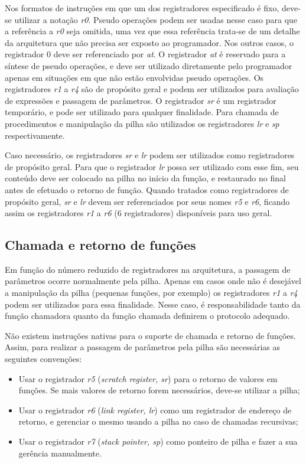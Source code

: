 \documentclass{extreport}
\begin{document}
Nos formatos de instruções em que um dos registradores especificado é fixo, deve-se utilizar a notação \textit{r0}. Pseudo operações podem ser usadas nesse caso para que a referência a \textit{r0} seja omitida, uma vez que essa referência trata-se de um detalhe da arquitetura que não precisa ser exposto ao programador. Nos outros casos, o registrador 0 deve ser referenciado por \textit{at}. O registrador \textit{at} é reservado para a síntese de pseudo operações, e deve ser utilizado diretamente pelo programador apenas em situações em que não estão envolvidas pseudo operações. Os registradores \textit{r1} a \textit{r4} são de propósito geral e podem ser utilizados para avaliação de expressões e passagem de parâmetros. O registrador \textit{sr} é um registrador temporário, e pode ser utilizado para qualquer finalidade. Para chamada de procedimentos e manipulação da pilha são utilizados os registradores \textit{lr} e \textit{sp} respectivamente.

Caso necessário, os registradores \textit{sr} e \textit{lr} podem ser utilizados como registradores de propósito geral. Para que o registrador \textit{lr} possa ser utilizado com esse fim, seu conteúdo deve ser colocado na pilha no início da função, e restaurado no final antes de efetuado o retorno de função. Quando tratados como registradores de propósito geral, \textit{sr} e \textit{lr} devem ser referenciados por seus nomes \textit{r5} e \textit{r6}, ficando assim os registradores \textit{r1} a \textit{r6} (6 registradores) disponíveis para uso geral.

\subsection{Chamada e retorno de funções}
\label{ref:fcalls}
Em função do número reduzido de registradores na arquitetura, a passagem de parâmetros ocorre normalmente pela pilha. Apenas em casos onde não é desejável a manipulação da pilha (pequenas funções, por exemplo) os registradores \textit{r1} a \textit{r4} podem ser utilizados para essa finalidade. Nesse caso, é responsabilidade tanto da função chamadora quanto da função chamada definirem o protocolo adequado.

Não existem instruções nativas para o suporte de chamada e retorno de funções. Assim, para realizar a passagem de parâmetros pela pilha são necessárias as seguintes convenções:

\begin{itemize}
\item Usar o registrador \textit{r5} (\textit{scratch register, sr}) para o retorno de valores em funções. Se mais valores de retorno forem necessários, deve-se utilizar a pilha;
\item Usar o registrador \textit{r6} (\textit{link register, lr}) como um registrador de endereço de retorno, e gerenciar o mesmo usando a pilha no caso de chamadas recursivas;
\item Usar o registrador \textit{r7} (\textit{stack pointer, sp}) como ponteiro de pilha e fazer a sua gerência manualmente.
\end{itemize}
\end{document}
